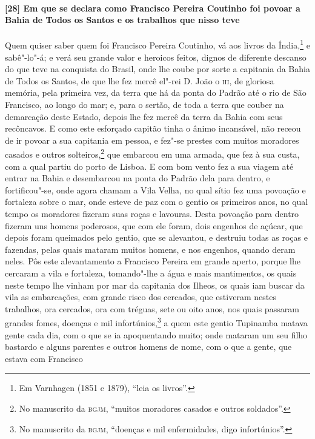 \begin{linenumbers}
\paragraph{[28] Em que se declara como Francisco Pereira Coutinho foi povoar a Bahia de
Todos os Santos e os trabalhos que nisso teve} \quad
Quem quiser saber quem foi Francisco Pereira Coutinho, vá aos livros da Índia,\footnote{
Em Varnhagen (1851 e 1879), ``leia os livros''.} e sabê"-lo"-á; e verá seu grande valor e
heroicos feitos, dignos de diferente descanso do que teve na conquista do Brasil, onde lhe
coube por sorte a capitania da Bahia de Todos os Santos, de que lhe fez mercê el"-rei D.
João o \textsc{iii}, de gloriosa memória, pela primeira vez, da terra que há da ponta do
Padrão até o rio de São Francisco, ao longo do mar; e, para o sertão, de toda a terra que
couber na demarcação deste Estado, depois lhe fez mercê da terra da Bahia com seus
recôncavos. E como este esforçado capitão tinha o ânimo incansável, não receou de ir
povoar a sua capitania em pessoa, e fez"-se prestes com muitos moradores casados e outros
solteiros,\footnote{ No manuscrito da \textsc{bgjm}, ``muitos moradores casados e outros
soldados''.} que embarcou em uma armada, que fez à sua custa, com a qual partiu do porto
de Lisboa. E com bom vento fez a sua viagem até entrar na Bahia e desembarcou na ponta do
Padrão dela para dentro, e fortificou"-se, onde agora chamam a Vila Velha, no qual sítio
fez uma povoação e fortaleza sobre o mar, onde esteve de paz com o gentio os primeiros
anos, no qual tempo os moradores fizeram suas roças e lavouras. Desta povoação para dentro
fizeram uns homens poderosos, que com ele foram, dois engenhos de açúcar, que depois foram
queimados pelo gentio, que se alevantou, e destruiu todas as roças e fazendas, pelas quais
mataram muitos homens, e nos engenhos, quando deram neles. Pôs este alevantamento a
Francisco Pereira em grande aperto, porque lhe cercaram a vila e fortaleza, tomando"-lhe a
água e mais mantimentos, os quais neste tempo lhe vinham por mar da capitania dos Ilheos,
os quais iam buscar da vila as embarcações, com grande risco dos cercados, que estiveram
nestes trabalhos, ora cercados, ora com tréguas, sete ou oito anos, nos quais passaram
grandes fomes, doenças e mil infortúnios,\footnote{ No manuscrito da \textsc{bgjm},
``doenças e mil enfermidades, digo infortúnios''.} a quem este gentio Tupinamba matava
gente cada dia, com o que se ia apoquentando muito; onde mataram um seu filho bastardo e
alguns parentes e outros homens de nome, com o que a gente, que estava com Francisco

\end{linenumbers}
